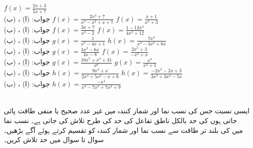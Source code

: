 $f(x)=\tfrac{2x+3}{5x+7}$\\
جواب:\quad
(ا) ، (ب) 
$f(x)=\tfrac{2x^3+7}{x^3-x^2+x+7}$
$f(x)=\tfrac{x+1}{x^2+3}$\\
جواب:\quad
(ا) ، (ب) 
$f(x)=\tfrac{3x+7}{x^2-2}$
$f(x)=\tfrac{1-12x^3}{4x^2+12}$\\
جواب:\quad
(ا) ، (ب) 
$g(x)=\tfrac{1}{x^3-4x+1}$
$h(x)=\tfrac{7x^3}{x^3-3x^2+6x}$\\
جواب:\quad
(ا) ، (ب) 
$g(x)=\tfrac{3x^2-6x}{4x-8}$
$f(x)=\tfrac{2x^5+3}{-x^2+x}$\\
جواب:\quad
(ا) ، (ب) 
$g(x)=\tfrac{10x^5+x^4+31}{x^6}$
$g(x)=\tfrac{x^4}{x^3+1}$\\
جواب:\quad
(ا) ، (ب) 
$h(x)=\tfrac{9x^4+x}{2x^4+5x^2-x+6}$
$h(x)=\tfrac{-2x^3-2x+3}{3x^3+3x^2-5x}$\\
جواب:\quad
(ا) ، (ب) 
$h(x)=\tfrac{-x^4}{x^4-7x^3+7x^2+9}$

\\
ایسی نسبت جس کی نسب نما اور شمار کنندہ میں غیر عدد صحیح یا منفی طاقت پائی جاتی ہوں کی حد بالکل ناطق تفاعل کی حد کی طرح تلاش کی جاتی ہے۔ نسب نما میں  کی بلند تر طاقت سے نسب نما اور شمار کنندہ کو تقسیم کرتے ہوئے آگے بڑھیں۔ سوال  تا سوال  میں حد تلاش کریں۔

